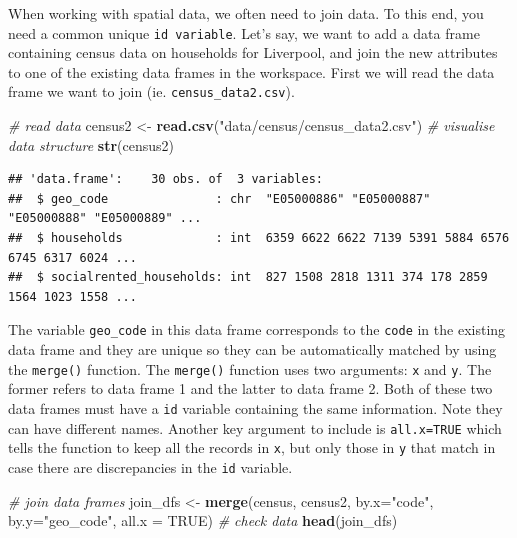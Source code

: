 \documentclass[
]{book}
\newenvironment{Shaded}{\begin{snugshade}}{\end{snugshade}}
\newcommand{\CommentTok}[1]{\textcolor[rgb]{0.56,0.35,0.01}{\textit{#1}}}
\newcommand{\DataTypeTok}[1]{\textcolor[rgb]{0.13,0.29,0.53}{#1}}
\newcommand{\KeywordTok}[1]{\textcolor[rgb]{0.13,0.29,0.53}{\textbf{#1}}}
\newcommand{\NormalTok}[1]{#1}
\newcommand{\OtherTok}[1]{\textcolor[rgb]{0.56,0.35,0.01}{#1}}
\newcommand{\StringTok}[1]{\textcolor[rgb]{0.31,0.60,0.02}{#1}}
\begin{document}
When working with spatial data, we often need to join data. To this end, you need a common unique \texttt{id\ variable}. Let's say, we want to add a data frame containing census data on households for Liverpool, and join the new attributes to one of the existing data frames in the workspace. First we will read the data frame we want to join (ie. \texttt{census\_data2.csv}).

\begin{Shaded}
\begin{Highlighting}[]
\CommentTok{# read data}
\NormalTok{census2 <-}\StringTok{ }\KeywordTok{read.csv}\NormalTok{(}\StringTok{"data/census/census_data2.csv"}\NormalTok{)}
\CommentTok{# visualise data structure}
\KeywordTok{str}\NormalTok{(census2)}
\end{Highlighting}
\end{Shaded}

\begin{verbatim}
## 'data.frame':    30 obs. of  3 variables:
##  $ geo_code               : chr  "E05000886" "E05000887" "E05000888" "E05000889" ...
##  $ households             : int  6359 6622 6622 7139 5391 5884 6576 6745 6317 6024 ...
##  $ socialrented_households: int  827 1508 2818 1311 374 178 2859 1564 1023 1558 ...
\end{verbatim}

The variable \texttt{geo\_code} in this data frame corresponds to the \texttt{code} in the existing data frame and they are unique so they can be automatically matched by using the \texttt{merge()} function. The \texttt{merge()} function uses two arguments: \texttt{x} and \texttt{y}. The former refers to data frame 1 and the latter to data frame 2. Both of these two data frames must have a \texttt{id} variable containing the same information. Note they can have different names. Another key argument to include is \texttt{all.x=TRUE} which tells the function to keep all the records in \texttt{x}, but only those in \texttt{y} that match in case there are discrepancies in the \texttt{id} variable.

\begin{Shaded}
\begin{Highlighting}[]
\CommentTok{# join data frames}
\NormalTok{join_dfs <-}\StringTok{ }\KeywordTok{merge}\NormalTok{(census, census2, }\DataTypeTok{by.x=}\StringTok{"code"}\NormalTok{, }\DataTypeTok{by.y=}\StringTok{"geo_code"}\NormalTok{, }\DataTypeTok{all.x =} \OtherTok{TRUE}\NormalTok{)}
\CommentTok{# check data}
\KeywordTok{head}\NormalTok{(join_dfs)}
\end{Highlighting}
\end{Shaded}
\end{document}
